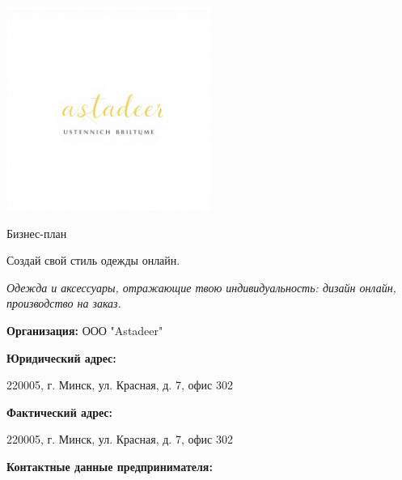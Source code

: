 \begin{titlepage}
\centering

\vspace*{-3cm} %
\includegraphics[width=0.5\textwidth]{img/logo.png} %
\vspace{1.5cm}

{\selectfont\Huge Бизнес-план\par} %
\vspace{0.8cm}

{\selectfont\Huge Создай свой стиль одежды онлайн.\par} %
\vspace{0.4cm}

{\textit{Одежда и аксессуары, отражающие твою индивидуальность: дизайн онлайн, производство на заказ.}\par}
\vspace{1.5cm}

{\Large \textbf{Организация:} ООО "Astadeer" \par}
\vspace{0.4cm}

{\textbf{Юридический адрес:} \par}
220005, г. Минск, ул. Красная, д. 7, офис 302 \par
\vspace{0.2cm}

{\textbf{Фактический адрес:} \par}
220005, г. Минск, ул. Красная, д. 7, офис 302 \par
\vspace{0.4cm}

{\Large \textbf{Контактные данные предпринимателя:} \par}
\vspace{0.2cm}


\end{titlepage}
